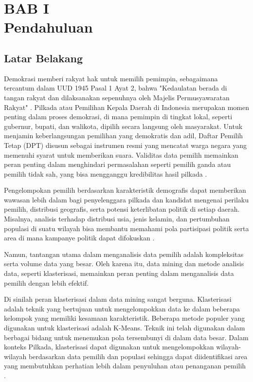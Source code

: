 \section*{\centering BAB I \\ Pendahuluan}

\setcounter{section}{1}

\subsection{Latar Belakang}
Demokrasi memberi rakyat hak untuk memilih pemimpin, sebagaimana tercantum dalam UUD 1945 Pasal 1 Ayat 2, bahwa "Kedaulatan berada di tangan rakyat dan dilaksanakan sepenuhnya oleh Majelis Permusyawaratan Rakyat" \cite{PasalDemokrasi}. Pilkada atau Pemilihan Kepala Daerah di Indonesia merupakan momen penting dalam proses demokrasi, di mana pemimpin di tingkat lokal, seperti gubernur, bupati, dan walikota, dipilih secara langsung oleh masyarakat. Untuk menjamin keberlangsungan pemilihan yang demokratis dan adil, Daftar Pemilih Tetap (DPT) disusun sebagai instrumen resmi yang mencatat warga negara yang memenuhi syarat untuk memberikan suara. Validitas data pemilih memainkan peran penting dalam menghindari permasalahan seperti pemilih ganda atau pemilih tidak sah, yang bisa mengganggu kredibilitas hasil pilkada \cite{InstrumenDpt}.

Pengelompokan pemilih berdasarkan karakteristik demografis dapat memberikan wawasan lebih dalam bagi penyelenggara pilkada dan kandidat mengenai perilaku pemilih, distribusi geografis, serta potensi keterlibatan politik di setiap daerah. Misalnya, analisis terhadap distribusi usia, jenis kelamin, dan pertumbuhan populasi di suatu wilayah bisa membantu memahami pola partisipasi politik serta area di mana kampanye politik dapat difokuskan \cite{ImplementasiDataPemilihBerkelanjutan}.

Namun, tantangan utama dalam menganalisis data pemilih adalah kompleksitas serta volume data yang besar. Oleh karena itu, data mining dan metode analisis data, seperti klasterisasi, memainkan peran penting dalam menganalisis data pemilih dengan lebih efektif.

Di sinilah peran klasterisasi dalam data mining sangat berguna. Klasterisasi adalah teknik yang bertujuan untuk mengelompokkan data ke dalam beberapa kelompok yang memiliki kesamaan karakteristik. Beberapa metode populer yang digunakan untuk klasterisasi adalah K-Means. Teknik ini telah digunakan dalam berbagai bidang untuk menemukan pola tersembunyi di dalam data besar. Dalam konteks Pilkada, klasterisasi dapat digunakan untuk mengelompokkan wilayah-wilayah berdasarkan data pemilih dan populasi sehingga dapat diidentifikasi area yang membutuhkan perhatian lebih dalam penyuluhan atau penanganan pemilih \cite{DataMiningTechniques}.


